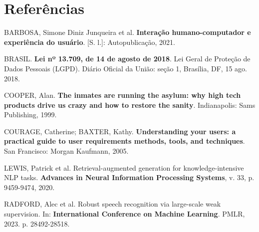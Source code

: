 \documentclass[11pt,a4paper]{article}
\begin{document}
\clearpage

\section*{Referências}

\noindent BARBOSA, Simone Diniz Junqueira et al. \textbf{Interação humano-computador e experiência do usuário}. [S. l.]: Autopublicação, 2021.

\vspace{0.2cm}
\noindent BRASIL. \textbf{Lei nº 13.709, de 14 de agosto de 2018}. Lei Geral de Proteção de Dados Pessoais (LGPD). Diário Oficial da União: seção 1, Brasília, DF, 15 ago. 2018.

\vspace{0.2cm}
\noindent COOPER, Alan. \textbf{The inmates are running the asylum: why high tech products drive us crazy and how to restore the sanity}. Indianapolis: Sams Publishing, 1999.

\vspace{0.2cm}
\noindent COURAGE, Catherine; BAXTER, Kathy. \textbf{Understanding your users: a practical guide to user requirements methods, tools, and techniques}. San Francisco: Morgan Kaufmann, 2005.

\vspace{0.2cm}
\noindent LEWIS, Patrick et al. Retrieval-augmented generation for knowledge-intensive NLP tasks. \textbf{Advances in Neural Information Processing Systems}, v. 33, p. 9459-9474, 2020.

\vspace{0.2cm}
\noindent RADFORD, Alec et al. Robust speech recognition via large-scale weak supervision. In: \textbf{International Conference on Machine Learning}. PMLR, 2023. p. 28492-28518.
\end{document}
